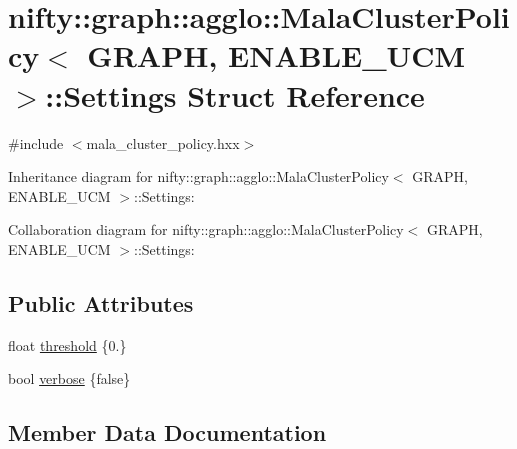 \hypertarget{structnifty_1_1graph_1_1agglo_1_1MalaClusterPolicy_1_1Settings}{}\section{nifty\+:\+:graph\+:\+:agglo\+:\+:Mala\+Cluster\+Policy$<$ G\+R\+A\+P\+H, E\+N\+A\+B\+L\+E\+\_\+\+U\+C\+M $>$\+:\+:Settings Struct Reference}
\label{structnifty_1_1graph_1_1agglo_1_1MalaClusterPolicy_1_1Settings}


{\ttfamily \#include $<$mala\+\_\+cluster\+\_\+policy.\+hxx$>$}



Inheritance diagram for nifty\+:\+:graph\+:\+:agglo\+:\+:Mala\+Cluster\+Policy$<$ G\+R\+A\+P\+H, E\+N\+A\+B\+L\+E\+\_\+\+U\+C\+M $>$\+:\+:Settings\+:


Collaboration diagram for nifty\+:\+:graph\+:\+:agglo\+:\+:Mala\+Cluster\+Policy$<$ G\+R\+A\+P\+H, E\+N\+A\+B\+L\+E\+\_\+\+U\+C\+M $>$\+:\+:Settings\+:
\subsection*{Public Attributes}
\begin{DoxyCompactItemize}
\item 
float \hyperlink{structnifty_1_1graph_1_1agglo_1_1MalaClusterPolicy_1_1Settings_a481d8fd0a487b71ad67d1ea1f1ce51a0}{threshold} \{0.\}
\item 
bool \hyperlink{structnifty_1_1graph_1_1agglo_1_1MalaClusterPolicy_1_1Settings_ab892447b233b3e89473ad3fee83a305e}{verbose} \{false\}
\end{DoxyCompactItemize}


\subsection{Member Data Documentation}
\hypertarget{structnifty_1_1graph_1_1agglo_1_1MalaClusterPolicy_1_1Settings_a481d8fd0a487b71ad67d1ea1f1ce51a0}{}
